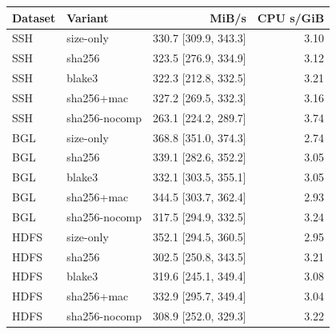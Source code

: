 
\begin{tabular}{@{}llrr@{}}
\toprule
Dataset & Variant & MiB/s & CPU s/GiB \\
\midrule
SSH & size-only & 330.7 [309.9, 343.3] & 3.10 \\
SSH & sha256 & 323.5 [276.9, 334.9] & 3.12 \\
SSH & blake3 & 322.3 [212.8, 332.5] & 3.21 \\
SSH & sha256+mac & 327.2 [269.5, 332.3] & 3.16 \\
SSH & sha256-nocomp & 263.1 [224.2, 289.7] & 3.74 \\
\addlinespace
BGL & size-only & 368.8 [351.0, 374.3] & 2.74 \\
BGL & sha256 & 339.1 [282.6, 352.2] & 3.05 \\
BGL & blake3 & 332.1 [303.5, 355.1] & 3.05 \\
BGL & sha256+mac & 344.5 [303.7, 362.4] & 2.93 \\
BGL & sha256-nocomp & 317.5 [294.9, 332.5] & 3.24 \\
\addlinespace
HDFS & size-only & 352.1 [294.5, 360.5] & 2.95 \\
HDFS & sha256 & 302.5 [250.8, 343.5] & 3.21 \\
HDFS & blake3 & 319.6 [245.1, 349.4] & 3.08 \\
HDFS & sha256+mac & 332.9 [295.7, 349.4] & 3.04 \\
HDFS & sha256-nocomp & 308.9 [252.0, 329.3] & 3.22 \\
\bottomrule
\end{tabular}
